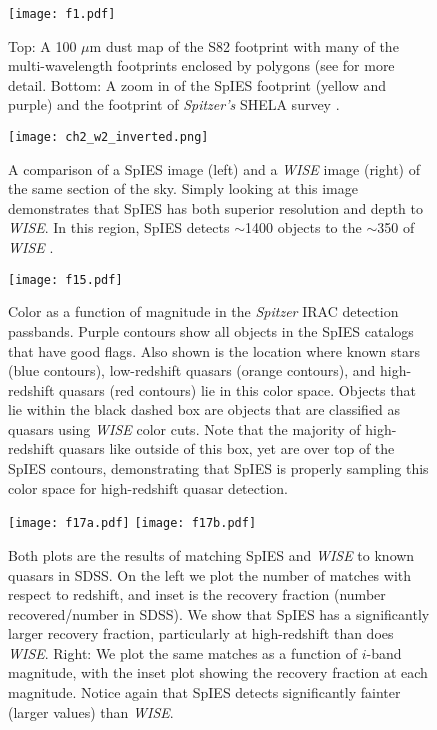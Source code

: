 \documentclass[onecolumn]{emulateapj}
\begin{document}
\begin{figure}[!h]
	\centering
	\texttt{[image: f1.pdf]}
	\caption{\footnotesize{Top: A 100 $\mu$m dust map of the S82 footprint with many of the multi-wavelength footprints enclosed by polygons (see \citealt{Timlin2016} for more detail. Bottom: A zoom in of the SpIES footprint (yellow and purple) and the footprint of \emph{Spitzer's} SHELA survey \citealt{Papovich2011}.}}
	\label{spies_footprint}
\end{figure}

\begin{figure}[!h]
	\centering
	\texttt{[image: ch2\_w2\_inverted.png]}
	\caption{\footnotesize{A comparison of a SpIES image (left) and a \emph{WISE} image (right) of the same section of the sky. Simply looking at this image demonstrates that SpIES has both superior resolution and depth to \emph{WISE}. In this region, SpIES detects $\sim$1400 objects to the $\sim$350 of \emph{WISE} \citep{Timlin2016}.}}
	\label{ch2w2}
\end{figure}

\begin{figure}[!h]
	\centering
	\texttt{[image: f15.pdf]}
	\caption{\footnotesize{Color as a function of magnitude in the \emph{Spitzer} IRAC detection passbands. Purple contours show all objects in the SpIES catalogs that have good flags. Also shown is the location where known stars (blue contours), low-redshift quasars (orange contours), and high-redshift quasars (red contours) lie in this color space. Objects that lie within the black dashed box are objects that are classified as quasars using \emph{WISE} color cuts. Note that the majority of high-redshift quasars like outside of this box, yet are over top of the SpIES contours, demonstrating that SpIES is properly sampling this color space for high-redshift quasar detection.}}
	\label{spies_colors}
\end{figure}

\begin{figure}[!h]
	\centering
	\texttt{[image: f17a.pdf]}
	\texttt{[image: f17b.pdf]}
	\caption{\footnotesize{Both plots are the results of matching SpIES and \emph{WISE} to known quasars in SDSS. On the left we plot the number of matches with respect to redshift, and inset is the recovery fraction (number recovered/number in SDSS). We show that SpIES has a significantly larger recovery fraction, particularly at high-redshift than does \emph{WISE}. Right: We plot the same matches as a function of $i$-band magnitude, with the inset plot showing the recovery fraction at each magnitude. Notice again that SpIES detects significantly fainter (larger values) than \emph{WISE}.}}
	\label{spies_detections}
\end{figure}
\end{document}
